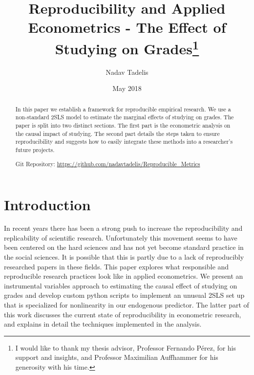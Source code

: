 \documentclass[12pt]{article}
\begin{document}
\title{Reproducibility and Applied Econometrics - The Effect of Studying on Grades\footnote{I would like to thank my thesis advisor, Professor Fernando P\'erez, for his support and insights, and Professor Maximilian Auffhammer for his generosity with his time.}}

\author{Nadav Tadelis}

\date{May 2018}



\maketitle

\hskip 80pt 


\begin{abstract}
In this paper we establish a framework for reproducible empirical research. We use a non-standard 2SLS model to estimate the marginal effects of studying on grades. The paper is split into two distinct sections. The first part is the econometric analysis on the causal impact of studying. The second part details the steps taken to ensure reproducibility and suggests how to easily integrate these methods into a researcher's future projects.

\vspace{3mm}
\noindent Git Repository: \url{https://github.com/nadavtadelis/Reproducible_Metrics}
\end{abstract}

\clearpage


\section{Introduction}
\label{sec_intro}
In recent years there has been a strong push to increase the reproducibility and replicability of scientific research. Unfortunately this movement seems to have been centered on the hard sciences and has not yet become standard practice in the social sciences. It is possible that this is partly due to a lack of reproducibly researched papers in these fields. This paper explores what responsible and reproducible research practices look like in applied econometrics. We present an instrumental variables approach to estimating the causal effect of studying on grades and develop custom python scripts to implement an unusual 2SLS set up that is specialized for nonlinearity in our endogenous predictor. The latter part of this work discusses the current state of reproducibility in econometric research, and explains in detail the techniques implemented in the analysis.
\end{document}
